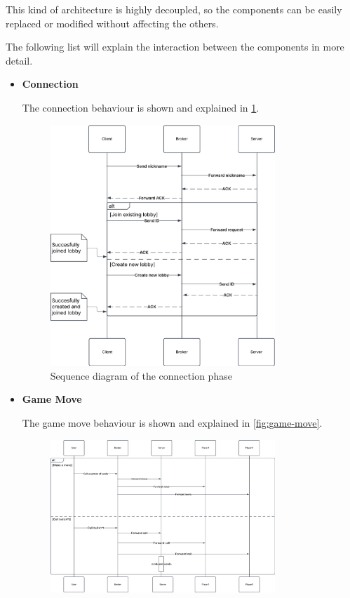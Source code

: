 \documentclass{scrartcl}
\begin{document}
This kind of architecture is highly decoupled, so the components can be easily replaced or modified
without affecting the others.

The following list will explain the interaction between the components in more detail.

\begin{itemize}
      \item \textbf{Connection} \par
            The connection behaviour is shown and explained in \cref{fig:connection}.
            \begin{figure}
                  \centering
                  \includegraphics[width=0.8\textwidth]{figures/sequenceConnection.png}
                  \caption{Sequence diagram of the connection phase}
                  \label{fig:connection}
            \end{figure}
      \item \textbf{Game Move} \par
            The game move behaviour is shown and explained in \cref{fig:game-move}.
            \begin{figure}
                  \centering
                  \includegraphics[width=0.8\textwidth]{figures/sequenceGameMove.png}

\end{figure}
\end{itemize}
\end{document}
